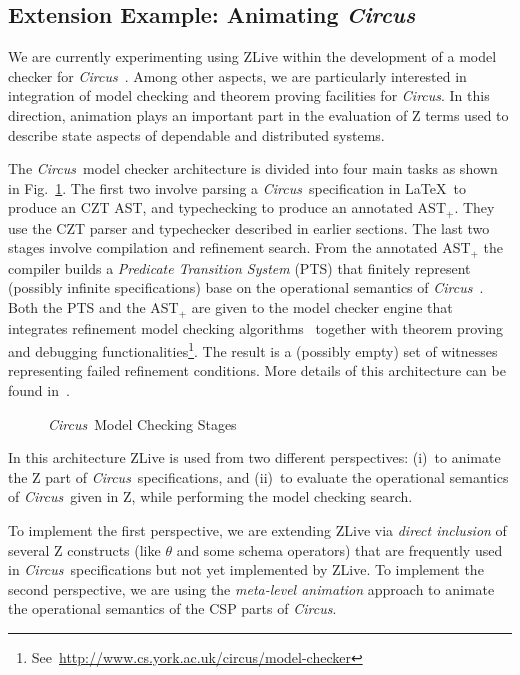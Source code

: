 \documentclass{llncs}
\newcommand{\Circus}{{\sf\slshape Circus}}
\begin{document}
\subsection{Extension Example: Animating \Circus}

    We are currently experimenting using ZLive within the development
    of a model checker for \Circus~\cite{circus.mc:leo}. Among other aspects,
    we are particularly interested in integration of model checking and
    theorem proving facilities for \Circus. In this direction, animation plays
    an important part in the evaluation of Z terms used to describe state
    aspects of dependable and distributed systems.

    The \Circus\ model checker architecture is divided into four main
    tasks as shown in Fig.~\ref{mc-stages}.  The first two involve
    parsing a \Circus\ specification in \LaTeX\ to produce an CZT AST,
    and typechecking to produce an annotated AST$_{+}$.
    They use the CZT parser and typechecker described in earlier sections.
    The last two stages involve compilation and refinement search.
    From the annotated AST$_{+}$ the compiler builds a \textit{Predicate Transition System}
    (PTS) that finitely represent (possibly infinite specifications) base on the
    operational semantics of \Circus~\cite{circus.mc:opsem}. Both the PTS and
    the AST$_{+}$ are given to the model checker engine that integrates refinement
    model checking algorithms~\cite{csp.mc:main,csp.mc:bisequiv}
    together with theorem proving and debugging
    functionalities\footnote{See~\url{http://www.cs.york.ac.uk/circus/model-checker}}.
    The result is a (possibly empty) set of witnesses representing failed
    refinement conditions. More details of this architecture can be found in~\cite{circus.mc:leo}.
    \begin{figure}[t]
        \begin{center}
        \end{center} \caption{\Circus\ Model Checking Stages}\label{mc-stages}
    \end{figure}

    In this architecture ZLive is used from two different perspectives:
    (i)~to animate the Z part of \Circus\ specifications, and
    (ii)~to evaluate the operational semantics of \Circus\ given in Z, 
    while performing the model checking search.

    To implement the first perspective, we are extending ZLive via
    \emph{direct inclusion} of several Z constructs (like $\theta$ and
    some schema operators) that are frequently used in \Circus\
    specifications but not yet implemented by ZLive.  To implement the
    second perspective, we are using the \emph{meta-level animation}
    approach to animate the operational semantics of the CSP parts of
    \Circus.
\end{document}
